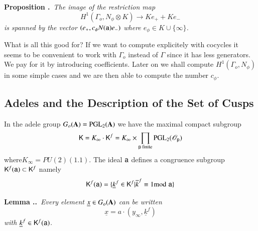\medskip
\noindent
{\bf Proposition .\label{art2-prop1.2.4}}~{\em The image of the restriction map}
$$
H^{1}(\Gamma_{o},N_{\phi}\otimes K)\to Ke_{+}+Ke_{-}
$$
{\em is spanned by the vector $(e_{+},c_{\phi}N(\mathsf{a})e_{-})$ where $e_{\phi}\in K\cup \{\infty\}$.}

\smallskip
What is all this good for? If we want to compute explicitely with cocycles it seems to be convenient to work with $\Gamma_{o}$ instead of $\Gamma$ since it has less generators. We pay for it by introducing coefficients. Later on we shall compute $H^{1}(\Gamma_{o},N_{\phi})$ in some simple cases and we are then able to compute the number $c_{\phi}$.

\subsection{Adeles and the Description of the Set of Cusps}\label{art2-sec1.3}

In the adele group $G_{o}(\mathbf{A})=\mathrm{PGL}_{2}(\mathbf{A})$ we have the maximal compact subgroup
$$
\mathsf{K}=K_{\infty}\cdot \mathsf{K}^{f}=K_{\infty}\times \prod\limits_{\mathsf{p}\text{~finite}}\mathrm{PGL}_{2}(\mathscr{O}_{\mathsf{p}})
$$
where\pageoriginale $K_{\infty}=PU(2)(1.1)$. The ideal $\mathsf{a}$ defines a congruence subgroup $\mathsf{K}^{f}(\mathsf{a})\subset \mathsf{K}^{f}$ namely
$$
\mathsf{K}^{f}(\mathsf{a})=\{\underline{k}^{f}\in \mathsf{K}^{f}|\overline{k}^{f}\equiv 1{\rm{mod}}\kern.3em \mathsf{a}\}
$$

\noindent
{\bf Lemma .\label{art2-lem1.3.1}.}~{\em Every element $\underline{x}\in G_{o}(\mathbf{A})$ can be written}
$$
\underline{x}=a\cdot (y_{\infty},\underline{k}^{f})
$$
{\em with $\underline{k}^{f}\in \mathsf{K}^{f}(\mathsf{a})$.}


